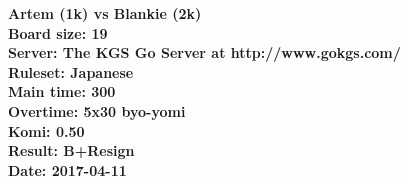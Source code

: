 \documentclass{article}
\begin{document}
\begin{titlepage}
    \null
    \vfill
    \begin{center}
        \textbf{Artem (1k) vs Blankie (2k)}\\
        \textbf{Board size: 19}\\
        \textbf{Server: The KGS Go Server at http://www.gokgs.com/}\\
        \textbf{Ruleset: Japanese}\\
        \textbf{Main time: 300}\\
        \textbf{Overtime: 5x30 byo-yomi}\\
        \textbf{Komi: 0.50}\\
        \textbf{Result: B+Resign}\\
        \textbf{Date: 2017-04-11}
    \end{center}
    \vfill
\end{titlepage}
\newpage
\tableofcontents
\newpage
\end{document}
